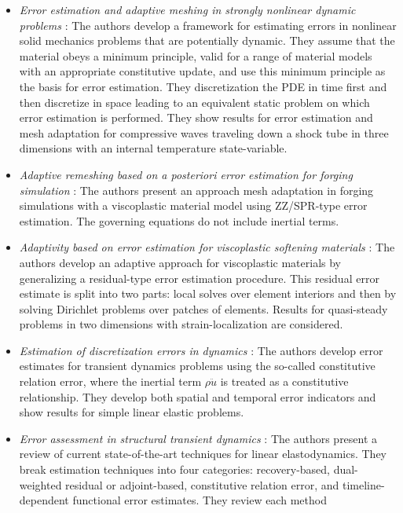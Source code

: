\documentclass{article}
\begin{document}
\begin{itemize}
\item
\emph{Error estimation and adaptive meshing in strongly nonlinear dynamic
problems} \cite{radovitzky1999error}: The authors develop a framework for
estimating errors in nonlinear solid mechanics problems that are potentially
dynamic. They assume that the material obeys a minimum principle, valid
for a range of material models with an appropriate constitutive update,
and use this minimum principle as the basis for error estimation. They
discretization the PDE in time first and then discretize in space leading
to an equivalent static problem on which error estimation is performed.
They show results for error estimation and mesh adaptation for compressive
waves traveling down a shock tube in three dimensions with an internal
temperature state-variable.
\item
\emph{Adaptive remeshing based on a posteriori error estimation for forging
simulation} \cite{boussetta2006adaptive}: The authors present an approach
mesh adaptation in forging simulations with a viscoplastic material model
using ZZ/SPR-type error estimation. The governing equations do not include
inertial terms.
\item
\emph{Adaptivity based on error estimation for viscoplastic softening
materials}  \cite{diez2000adaptivity}: The authors develop an adaptive
approach for viscoplastic materials by generalizing a residual-type
error estimation procedure. This residual error estimate is split into two
parts: local solves over element interiors and then by solving Dirichlet
problems over patches of elements. Results for quasi-steady problems in
two dimensions with strain-localization are considered.
\item
\emph{Estimation of discretization errors in dynamics}
\cite{ladeveze2003estimation}: The authors develop error estimates for
transient dynamics problems using the so-called constitutive relation error,
where the inertial term $\rho \ddot{u}$ is treated as a constitutive
relationship. They develop both spatial and temporal error indicators
and show results for simple linear elastic problems.
\item
\emph{Error assessment in structural transient dynamics}
\cite{verdugo2014error}: The authors present a review of current
state-of-the-art techniques for linear elastodynamics. They break
estimation techniques into four categories: recovery-based, dual-weighted
residual or adjoint-based, constitutive relation error, and
timeline-dependent functional error estimates. They review each method

\end{itemize}
\end{document}
